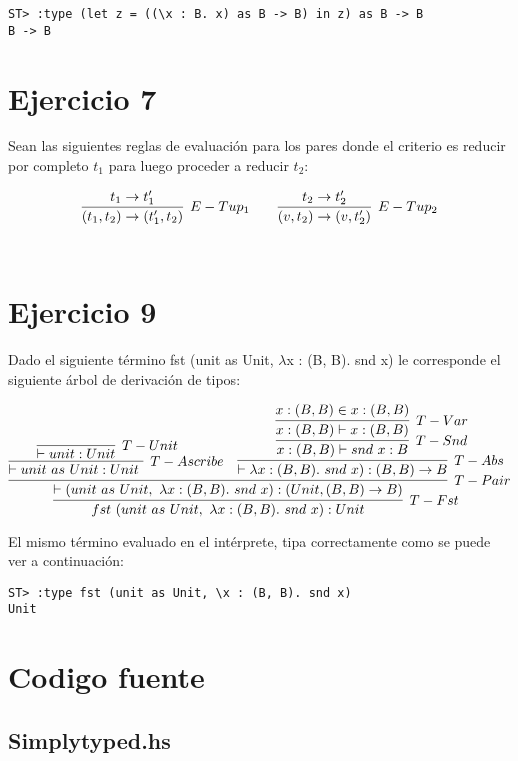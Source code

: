 \documentclass[a4paper,12pt]{article}
\begin{document}
\begin{verbatim}
ST> :type (let z = ((\x : B. x) as B -> B) in z) as B -> B
B -> B
\end{verbatim} 


\section*{Ejercicio 7}

Sean las siguientes reglas de evaluación para los pares donde el criterio es reducir 
por completo $t_{1}$ para luego proceder a reducir  $t_{2}$:

$$
\vcenter {
\infer[E-Tup_{1}] {(t_{1}, t_{2}) \to (t_{1}', t_{2})} {t_{1} \to t_{1}'}}
\qquad 
\vcenter {
\infer[E-Tup_{2}] {(v, t_{2}) \to (v, t_{2}')} {t_{2} \to t_{2}'}}
$$
\\

\section*{Ejercicio 9}

Dado el siguiente término  fst (unit as Unit, $\lambda$x : (B, B). snd x) le
corresponde el siguiente árbol de derivación de tipos:



$$
\vcenter {
\infer[T-Fst] {fst\ (unit\ as\ Unit,\ \lambda x  : (B, B).\ snd\ x) : Unit } {
  \infer[T-Pair] {\vdash (unit\ as\ Unit,\ \lambda x  : (B, B).\ snd\ x):(Unit,(B,B)\to B)} {
    \infer[T-Ascribe] {\vdash unit\ as\ Unit : Unit \ } {
       \infer[T-Unit] {\vdash unit : Unit} {}
        }
    &
    \infer[T-Abs] {\vdash \lambda x  : (B, B).\ snd\ x):(B,B)\to B} {
      \infer[T-Snd] {x:(B,B) \vdash snd\ x : B} {
        \infer[T-Var] {x:(B,B) \vdash x:(B,B)} {x:(B,B) \in x:(B,B)}
        }
      }
    }
  } 
}
$$

El mismo término evaluado en el intérprete, tipa correctamente como se puede ver a continuación:

\begin{verbatim}
ST> :type fst (unit as Unit, \x : (B, B). snd x)
Unit
\end{verbatim}

\newpage
\section*{\centering Codigo fuente}
\subsection*{Simplytyped.hs}
\inputminted[fontsize=\footnotesize]{haskell}{Simplytyped.hs}
\end{document}
